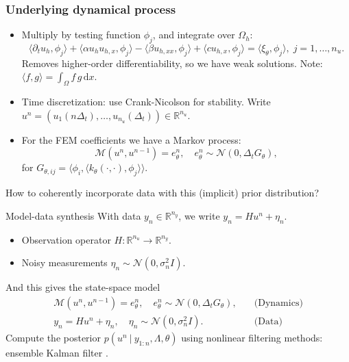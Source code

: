 \documentclass[aspectratio=1610]{beamer}
\newcommand{\given}{\:\vert\:}
\begin{document}
\begin{frame}
  \frametitle{Underlying dynamical process}
  \begin{itemize}
  \item Multiply by testing function $\phi_j$, and integrate over $\Omega_h$:
    \[
      \langle \partial_t u_h, \phi_j \rangle
      + \langle \alpha u_h u_{h, x}, \phi_j \rangle
      - \langle \beta u_{h, xx}, \phi_j \rangle
      + \langle c u_{h, x}, \phi_j \rangle = \langle \xi_\theta, \phi_j \rangle, \; j
      = 1, \ldots, n_u.
    \]
    \alert{Removes} higher-order differentiability, so we have \alert{weak
      solutions.} Note: $\langle f, g \rangle = \int_\Omega f \, g \, \mathrm{d} x$.
  \item Time discretization: use \alert{Crank-Nicolson} for stability. Write
    $u^n = (u_1(n\Delta_t), \ldots, u_{n_u}(\Delta_t)) \in \mathbb{R}^{n_u}$.
  \item For the \alert{FEM coefficients} we have a Markov process:
    \[
      \mathcal{M}(u^n, u^{n - 1}) = e_\theta^n, \quad e_\theta^n \sim
      \mathcal{N}(0, \Delta_t G_\theta),
    \]
    for $G_{\theta, ij} = \langle \phi_i, \langle k_\theta(\cdot, \cdot), \phi_j \rangle \rangle$.
  \end{itemize}
  \vspace{0.5cm}
  \pause
  
  How to coherently incorporate data with this (implicit) prior distribution? 
\end{frame}


\begin{frame}
  \begin{block}{{\Large Model-data synthesis}}
    With data $y_n \in \mathbb{R}^{n_y}$, we write $y_n = H u^n + \eta_n$.
    \begin{itemize}
    \item \alert{Observation operator} $H : \mathbb{R}^{n_u} \to \mathbb{R}^{n_y}$.
    \item \alert{Noisy measurements} $\eta_n \sim \mathcal{N}(0, \sigma_n^2 I)$.
    \end{itemize}
    And this gives the state-space model
    \begin{align*}
      \mathcal{M}(u^n, u^{n - 1}) = e_\theta^n ,
      \quad e_\theta^n \sim \mathcal{N}(0, \Delta_t G_\theta),
      \quad &\text{(Dynamics)} \\
      y_n = H u^n + \eta_n ,
      \quad \eta_n \sim \mathcal{N}(0, \sigma_n^2 I).
      \quad &\text{(Data)}
    \end{align*}
    Compute the posterior $p(u^n \given y_{1:n}, \Lambda, \theta)$ using
    nonlinear filtering methods: \alert{ensemble Kalman filter .}
  \end{block}
\end{frame}
\end{document}
